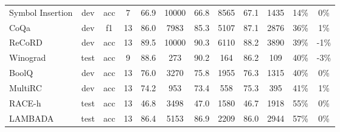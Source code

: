\documentclass{article}
\begin{document}
\begin{table}
{\begin{adjustwidth}{-1.4in}{-1.4in}
\begin{center}
\begin{tabular}{lccccccccccc}
    Symbol Insertion &   dev &      acc &   7 &        66.9 &                     10000 &                            66.8 &                      8565 &                            67.1 &                      1435 &                            14\% &                                                 0\% \\
                CoQa &   dev &       f1 &  13 &        86.0 &                      7983 &                            85.3 &                      5107 &                            87.1 &                      2876 &                            36\% &                                                 1\% \\
              ReCoRD &   dev &      acc &  13 &        89.5 &                     10000 &                            90.3 &                      6110 &                            88.2 &                      3890 &                            39\% &                                                -1\% \\
            Winograd &  test &      acc &   9 &        88.6 &                       273 &                            90.2 &                       164 &                            86.2 &                       109 &                            40\% &                                                -3\% \\
               BoolQ &   dev &      acc &  13 &        76.0 &                      3270 &                            75.8 &                      1955 &                            76.3 &                      1315 &                            40\% &                                                 0\% \\
             MultiRC &   dev &      acc &  13 &        74.2 &                       953 &                            73.4 &                       558 &                            75.3 &                       395 &                            41\% &                                                 1\% \\
              RACE-h &  test &      acc &  13 &        46.8 &                      3498 &                            47.0 &                      1580 &                            46.7 &                      1918 &                            55\% &                                                 0\% \\
             LAMBADA &  test &      acc &  13 &        86.4 &                      5153 &                            86.9 &                      2209 &                            86.0 &                      2944 &                            57\% &                                                 0\% \\

\end{tabular}
\end{center}
\end{adjustwidth}}
\end{table}
\end{document}
